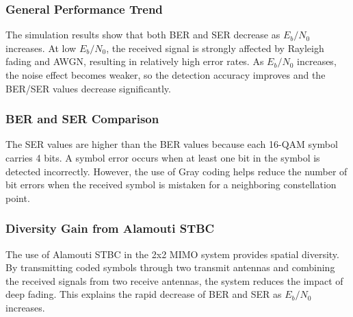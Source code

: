 \documentclass[a4paper]{article}
\begin{document}
\subsubsection{General Performance Trend}
The simulation results show that both BER and SER decrease as $E_b/N_0$ increases. At low $E_b/N_0$, the received signal is strongly affected by Rayleigh fading and AWGN, resulting in relatively high error rates. As $E_b/N_0$ increases, the noise effect becomes weaker, so the detection accuracy improves and the BER/SER values decrease significantly.

\subsubsection{BER and SER Comparison}
The SER values are higher than the BER values because each 16-QAM symbol carries 4 bits. A symbol error occurs when at least one bit in the symbol is detected incorrectly. However, the use of Gray coding helps reduce the number of bit errors when the received symbol is mistaken for a neighboring constellation point.

\subsubsection{Diversity Gain from Alamouti STBC}
The use of Alamouti STBC in the 2x2 MIMO system provides spatial diversity. By transmitting coded symbols through two transmit antennas and combining the received signals from two receive antennas, the system reduces the impact of deep fading. This explains the rapid decrease of BER and SER as $E_b/N_0$ increases.
\end{document}
